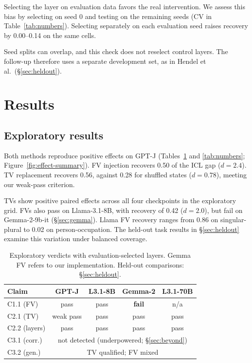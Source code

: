 \documentclass[11pt]{article}
\begin{document}
Selecting the layer on evaluation data favors the real intervention. We assess this bias by selecting on seed 0 and testing on the remaining seeds (CV in Table~\ref{tab:numbers}). Selecting separately on each evaluation seed raises recovery by 0.00--0.14 on the same cells.

Seed splits can overlap, and this check does not reselect control layers. The follow-up therefore uses a separate development set, as in Hendel et al.\ (\S\ref{sec:heldout}).

\section{Results}
\label{sec:results}

\subsection{Exploratory results}

Both methods reproduce positive effects on GPT-J (Tables~\ref{tab:verdicts} and \ref{tab:numbers}; Figure~\ref{fig:effect-summary}). FV injection recovers 0.50 of the ICL gap ($d=2.4$). TV replacement recovers 0.56, against 0.28 for shuffled states ($d=0.78$), meeting our weak-pass criterion.

TVs show positive paired effects across all four checkpoints in the exploratory grid. FVs also pass on Llama-3.1-8B, with recovery of 0.42 ($d=2.0$), but fail on Gemma-2-9b-it (\S\ref{sec:gemma}). Llama FV recovery ranges from 0.86 on singular-plural to 0.02 on person-occupation. The held-out task results in \S\ref{sec:heldout} examine this variation under balanced coverage.

\begin{table}[t]
  \centering
  \scriptsize
  \setlength{\tabcolsep}{2.5pt}
  \begin{tabular}{lcccc}
    \toprule
    \textbf{Claim} & \textbf{GPT-J} & \textbf{L3.1-8B} & \textbf{Gemma-2} & \textbf{L3.1-70B} \\
    \midrule
    C1.1 (FV) & pass & pass & \textbf{fail} & n/a \\
    C2.1 (TV) & weak pass & pass & pass & pass \\
    C2.2 (layers) & pass & pass & pass & pass \\
    C3.1 (corr.) & \multicolumn{4}{c}{not detected (underpowered; \S\ref{sec:beyond})} \\
    C3.2 (gen.) & \multicolumn{4}{c}{TV qualified; FV mixed} \\
    \bottomrule
  \end{tabular}
  \caption{Exploratory verdicts with evaluation-selected layers. Gemma FV refers to our implementation. Held-out comparisons: \S\ref{sec:heldout}.}
  \label{tab:verdicts}
\end{table}
\end{document}

